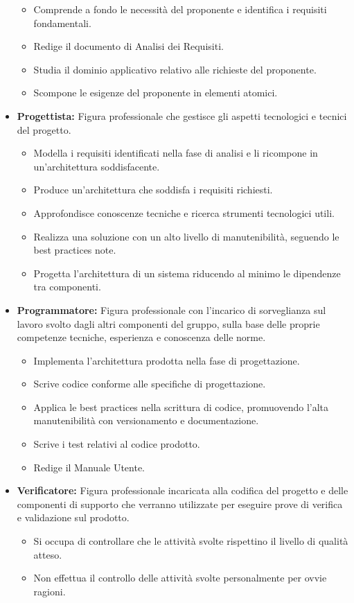 \documentclass{article}
\begin{document}
\begin{itemize}
\begin{itemize}
            \item Comprende a fondo le necessità del proponente e identifica i requisiti fondamentali.
            \item Redige il documento di Analisi dei Requisiti.
            \item Studia il dominio applicativo relativo alle richieste del proponente.
            \item Scompone le esigenze del proponente in elementi atomici.
        \end{itemize}
    \item \textbf{Progettista:}
        Figura professionale che gestisce gli aspetti tecnologici e tecnici del progetto.
        \begin{itemize}
            \item Modella i requisiti identificati nella fase di analisi e li ricompone in un'architettura soddisfacente.
            \item Produce un'architettura che soddisfa i requisiti richiesti.
            \item Approfondisce conoscenze tecniche e ricerca strumenti tecnologici utili.
            \item Realizza una soluzione con un alto livello di manutenibilità, seguendo le best practices note.
            \item Progetta l'architettura di un sistema riducendo al minimo le dipendenze tra componenti.
        \end{itemize}
    \item \textbf{Programmatore:}
        Figura professionale con l’incarico di sorveglianza sul lavoro svolto dagli altri componenti del gruppo, sulla base delle proprie competenze tecniche, esperienza e conoscenza delle norme.
        \begin{itemize}
            \item Implementa l'architettura prodotta nella fase di progettazione.
            \item Scrive codice conforme alle specifiche di progettazione.
            \item Applica le best practices nella scrittura di codice, promuovendo l'alta manutenibilità con versionamento e documentazione.
            \item Scrive i test relativi al codice prodotto.
            \item Redige il Manuale Utente.
        \end{itemize}
    \item  \textbf{Verificatore:}
        Figura professionale incaricata alla codifica del progetto e delle componenti di supporto che verranno utilizzate per eseguire prove di verifica e validazione sul prodotto.
        \begin{itemize}
            \item Si occupa di controllare che le attività svolte rispettino il livello di qualità atteso.
            \item Non effettua il controllo delle attività svolte personalmente per ovvie ragioni.
        \end{itemize}
        
\end{itemize}
\end{document}
